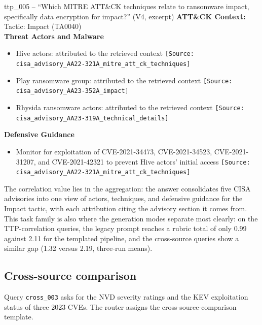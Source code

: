 \begin{responsebox}{ttp\_005 -- ``Which MITRE ATT\&CK techniques relate
to ransomware impact, specifically data encryption for impact?'' (V4,
excerpt)}
\textbf{ATT\&CK Context:} Tactic: Impact (TA0040)\\[4pt]
\textbf{Threat Actors and Malware}
\begin{itemize}
    \item Hive actors: attributed to the retrieved context
          \texttt{[Source: cisa\_advisory\_AA22-321A\_mitre\_att\_ck\_techniques]}
    \item Play ransomware group: attributed to the retrieved context
          \texttt{[Source: cisa\_advisory\_AA23-352A\_impact]}
    \item Rhysida ransomware actors: attributed to the retrieved context
          \texttt{[Source: cisa\_advisory\_AA23-319A\_technical\_details]}
\end{itemize}
\textbf{Defensive Guidance}
\begin{itemize}
    \item Monitor for exploitation of CVE-2021-34473, CVE-2021-34523,
          CVE-2021-31207, and CVE-2021-42321 to prevent Hive actors'
          initial access
          \texttt{[Source: cisa\_advisory\_AA22-321A\_mitre\_att\_ck\_techniques]}
\end{itemize}
\end{responsebox}

The correlation value lies in the aggregation: the answer consolidates
five CISA advisories into one view of actors, techniques, and defensive
guidance for the Impact tactic, with each attribution citing the
advisory section it comes from. This task family is also where the
generation modes separate most clearly: on the TTP-correlation queries,
the legacy prompt reaches a rubric total of only 0.99 against 2.11 for
the templated pipeline, and the cross-source queries show a similar gap
(1.32 versus 2.19, three-run means).

\subsection{Cross-source comparison}
\label{sec:scenario-cross}

Query \texttt{cross\_003} asks for the NVD severity ratings and the KEV
exploitation status of three 2023 CVEs. The router assigns the
cross-source-comparison template.

